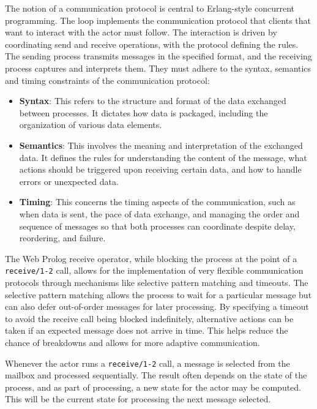 The notion of a communication protocol is central to Erlang-style concurrent programming. The loop implements the communication protocol that clients that want to interact with the actor must follow. The interaction is driven by coordinating send and receive operations, with the protocol defining the rules. The sending process transmits messages in the specified format, and the receiving process captures and interprets them. They must adhere to the syntax, semantics and timing constraints of the communication protocol:

\begin{itemize}

\item \textbf{Syntax}: This refers to the structure and format of the data exchanged between processes. It dictates how data is packaged, including the organization of various data elements.

\item \textbf{Semantics}: This involves the meaning and interpretation of the exchanged data. It defines the rules for understanding the content of the message, what actions should be triggered upon receiving certain data, and how to handle errors or unexpected data.

\item \textbf{Timing}: This concerns the timing aspects of the communication, such as when data is sent, the pace of data exchange, and managing the order and sequence of messages so that both processes can coordinate despite delay, reordering, and failure.

\end{itemize}

\noindent The Web Prolog receive operator, while blocking the process at the point of a \texttt{receive/1-2} call, allows for the implementation of very flexible communication protocols through mechanisms like selective pattern matching and timeouts. The selective pattern matching allows the process to wait for a particular message but can also defer out-of-order messages for later processing. By specifying a timeout to avoid the receive call being blocked indefinitely, alternative actions can be taken if an expected message does not arrive in time. This helps reduce the chance of breakdowns and allows for more adaptive communication.

Whenever the actor runs a \texttt{receive/1-2} call, a message is selected from the mailbox and processed sequentially. The result often depends on the state of the process, and as part of processing, a new state for the actor may be computed. This will be the current state for processing the next message selected.

